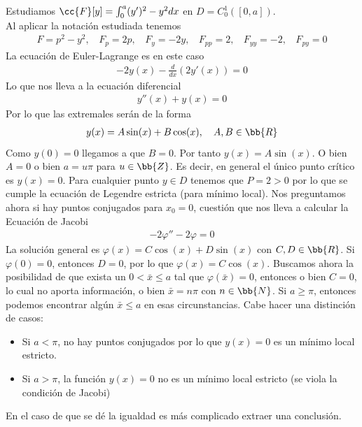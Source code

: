 \begin{ejemplo}
    Estudiamos $\cc{F}[y] = \int_0^a (y')^2 - y^2 dx$ en $D=C_0^1([0,a])$.\\

    Al aplicar la notación estudiada tenemos 
    \begin{gather*}
        F=p^2 - y^2,\ \ \ \ F_p=2p,\ \ \ \ F_{y}=-2y,\ \ \ \ F_{pp}=2,\ \ \ \ F_{yy}=-2,\ \ \ \ F_{py}=0
    \end{gather*}
    La ecuación de Euler-Lagrange es en este caso 
    \begin{gather*}
        -2y(x) - \frac{d}{dx}(2y'(x)) = 0
    \end{gather*}
    Lo que nos lleva a la ecuación diferencial
    \begin{gather*}
        y''(x)+y(x)=0
    \end{gather*}
    Por lo que las extremales serán de la forma 
    \begin{gather*}
        y(x) = A\sin(x) + B\cos(x),\ \ \ A,B\in \bb{R}
    \end{gather*}
    Como $y(0)=0$ llegamos a que $B=0$. Por tanto $y(x)= A\sin(x)$. O bien $A=0$ o bien $a=u\pi$ para $u\in \bb{Z}$. Es decir, en general el único punto crítico es $y(x)=0$. Para cualquier punto $y\in D$ tenemos que $P=2>0$ por lo que se cumple la ecuación de Legendre estricta (para mínimo local). Nos preguntamos ahora si hay puntos conjugados para $x_0=0$, cuestión que nos lleva a calcular la Ecuación de Jacobi
    \begin{gather*}
        -2\varphi''-2\varphi = 0
    \end{gather*}
    La solución general es $\varphi(x) = C\cos(x) + D\sin(x)$ con $C,D\in \bb{R}$. Si $\varphi(0)=0$, entonces $D=0$, por lo que $\varphi(x) = C\cos(x)$. Buscamos ahora la posibilidad de que exista un $0<\bar{x}\leq a$ tal que $\varphi(\bar{x})=0$, entonces o bien $C=0$, lo cual no aporta información, o bien $\bar{x}=n\pi$ con $n\in \bb{N}$. Si $a\geq \pi$, entonces podemos encontrar algún $\bar{x}\leq a$ en esas circunstancias. Cabe hacer una distinción de casos:
    \begin{itemize}
        \item Si $a<\pi$, no hay puntos conjugados por lo que $y(x)=0$ es un mínimo local estricto.
        \item Si $a>\pi$, la función $y(x)=0$ no es un mínimo local estricto (se viola la condición de Jacobi) 
    \end{itemize}
    En el caso de que se dé la igualdad es más complicado extraer una conclusión.
\end{ejemplo}

